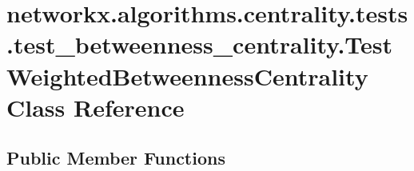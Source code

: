 \hypertarget{classnetworkx_1_1algorithms_1_1centrality_1_1tests_1_1test__betweenness__centrality_1_1TestWeightedBetweennessCentrality}{}\section{networkx.\+algorithms.\+centrality.\+tests.\+test\+\_\+betweenness\+\_\+centrality.\+Test\+Weighted\+Betweenness\+Centrality Class Reference}
\label{classnetworkx_1_1algorithms_1_1centrality_1_1tests_1_1test__betweenness__centrality_1_1TestWeightedBetweennessCentrality}
\subsection*{Public Member Functions}
